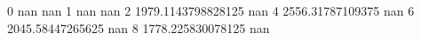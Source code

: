 0 nan nan
1 nan nan
2 1979.1143798828125 nan
4 2556.31787109375 nan
6 2045.58447265625 nan
8 1778.225830078125 nan
